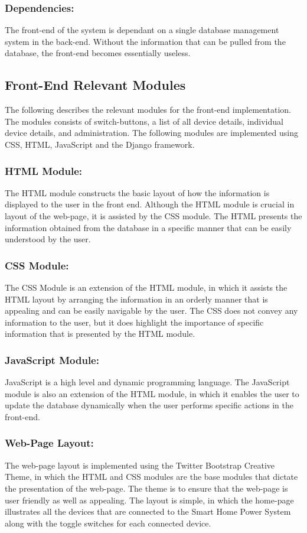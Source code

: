 \documentclass[10pt,twocolumn]{witseiepaper}
\begin{document}
	\subsubsection{Dependencies:}
	The front-end of the system is dependant on a single database management system in the back-end. Without the information that can be pulled from the database, the front-end becomes essentially useless.
	
	\subsection{Front-End Relevant Modules}
	The following describes the relevant modules for the front-end implementation. The modules consists of switch-buttons, a list of all device details, individual device details, and administration. The following modules are implemented using CSS, HTML, JavaScript and the Django framework. 
	
	\subsubsection{HTML Module:}
	The HTML module constructs the basic layout of how the information is displayed to the user in the front end. Although the HTML module is crucial in layout of the web-page, it is assisted by the CSS module. The HTML presents the information obtained from the database in a specific manner that can be easily understood by the user.
	
	\subsubsection{CSS Module:}
	The CSS Module is an extension of the HTML module, in which it assists the HTML layout by arranging the information in an orderly manner that is appealing and can be easily navigable by the user. The CSS does not convey any information to the user, but it does highlight the importance of specific information that is presented by the HTML module.
	
	\subsubsection{JavaScript Module:}
	JavaScript is a high level and dynamic programming language. The JavaScript module is also an extension of the HTML module, in which it enables the user to update the database dynamically when the user performs specific actions in the front-end.
	
	\subsubsection{Web-Page Layout:}
	The web-page layout is implemented using the Twitter Bootstrap Creative Theme, in which the HTML and CSS modules are the base modules that dictate the presentation of the web-page. The theme is to ensure that the web-page is user friendly as well as appealing. The layout is simple, in which the home-page illustrates all the devices that are connected to the Smart Home Power System along with the toggle switches for each connected device.
	
\end{document}
